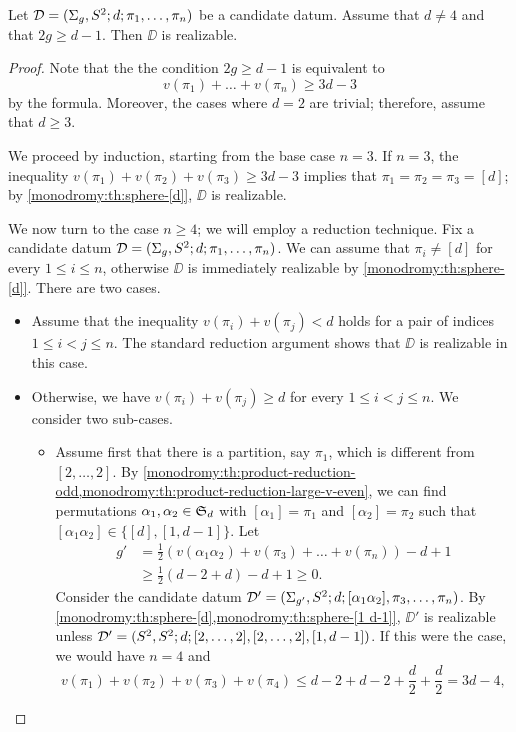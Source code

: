 \begin{proposition}\label{monodromy:th:sphere-large-g}
Let $\mathcal{D}=(\Sigma_{g},S^2{};d;\pi_1,\ldots,\pi_n)$ be a candidate datum. Assume that $d\neq 4$ and that $2g\ge d-1$. Then $\DD$ is realizable.
\end{proposition}
\begin{proof}
Note that the the condition $2g\ge d-1$ is equivalent to
\[
v(\pi_1)+\ldots+v(\pi_n)\ge 3d-3
\]
by the \RH{} formula. Moreover, the cases where $d=2$ are trivial; therefore, assume that $d\ge 3$.

We proceed by induction, starting from the base case $n=3$. If $n=3$, the inequality $v(\pi_1)+v(\pi_2)+v(\pi_3)\ge 3d-3$ implies that $\pi_1=\pi_2=\pi_3=[d]$; by \cref{monodromy:th:sphere-[d]}, $\DD$ is realizable.

We now turn to the case $n\ge 4$; we will employ a reduction technique. Fix a candidate datum $\mathcal{D}=(\Sigma_{g},S^2{};d;\pi_1,\ldots,\pi_n)$. We can assume that $\pi_i\neq[d]$ for every $1\le i\le n$, otherwise $\DD$ is immediately realizable by \cref{monodromy:th:sphere-[d]}. There are two cases.
\begin{itemize}
\item Assume that the inequality $v(\pi_i)+v(\pi_j)<d$ holds for a pair of indices $1\le i<j\le n$. The standard reduction argument shows that $\DD$ is realizable in this case.
\item Otherwise, we have $v(\pi_i)+v(\pi_j)\ge d$ for every $1\le i<j\le n$. We consider two sub-cases.
\begin{itemize}
\item Assume first that there is a partition, say $\pi_1$, which is different from $[2,\ldots,2]$. By \cref{monodromy:th:product-reduction-odd,monodromy:th:product-reduction-large-v-even}, we can find permutations $\alpha_1,\alpha_2\in\symgroup[d]$ with $[\alpha_1]=\pi_1$ and $[\alpha_2]=\pi_2$ such that $[\alpha_1\alpha_2]\in\{[d],[1,d-1]\}$. Let
\begin{align*}
g'&=\frac{1}{2}(v(\alpha_1\alpha_2)+v(\pi_3)+\ldots+v(\pi_n))-d+1\\
&\ge \frac{1}{2}(d-2+d)-d+1\ge 0.
\end{align*}
Consider the candidate datum $\mathcal{D}'=(\Sigma_{g'},S^2{};d;[\alpha_1\alpha_2],\pi_3,\ldots,\pi_n)$. By \cref{monodromy:th:sphere-[d],monodromy:th:sphere-[1 d-1]}, $\DD'$ is realizable unless $\mathcal{D}'=(S^2{},S^2{};d;[2,\ldots,2],[2,\ldots,2],[1,d-1])$. If this were the case, we would have $n=4$ and
\[
v(\pi_1)+v(\pi_2)+v(\pi_3)+v(\pi_4)\le d-2+d-2+\frac{d}{2}+\frac{d}{2}=3d-4,
\]
\end{itemize}
\end{itemize}
\end{proof}
